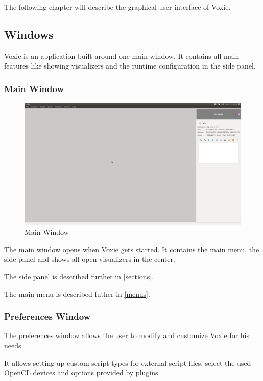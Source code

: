 
The following chapter will describe the graphical user interface of Voxie.

\subsection{Windows}

Voxie is an application built around one main window. It contains all main
features like showing visualizers and the runtime configuration in the
side panel.

\subsubsection{Main Window}

\begin{figure}[h]
  \centering
  \includegraphics[width=1.0\textwidth]{img/mainwindow.png}
  \caption{Main Window}
\end{figure}

The main window opens when Voxie gets started. It contains the main menu,
the side panel and shows all open visualizers in the center.

The side panel is described further in \ref{sections}.

The main menu is described futher in \ref{menus}.

\subsubsection{Preferences Window}
\label{preferences-window}

The preferences window allows the user to modify and customize Voxie for
his needs.

It allows setting up custom script types for external script files, select the
used OpenCL devices and options provided by plugins.

